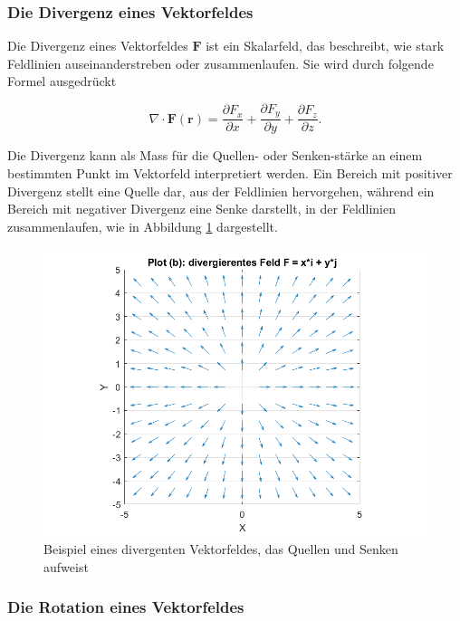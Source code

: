 \subsubsection{Die Divergenz eines Vektorfeldes}

Die Divergenz eines Vektorfeldes $\mathbf{F}$ ist ein Skalarfeld, das beschreibt, wie stark Feldlinien auseinanderstreben oder zusammenlaufen. Sie wird durch folgende Formel ausgedrückt

\begin{equation}
\nabla \cdot \mathbf{F}(\mathbf{r}) = \frac{\partial F_x}{\partial x} + \frac{\partial F_y}{\partial y} + \frac{\partial F_z}{\partial z}.
\end{equation}

\noindent Die Divergenz kann als Mass für die Quellen- oder Senken-stärke an einem bestimmten Punkt im Vektorfeld interpretiert werden. Ein Bereich mit positiver Divergenz stellt eine Quelle dar, aus der Feldlinien hervorgehen, während ein Bereich mit negativer Divergenz eine Senke darstellt, in der Feldlinien zusammenlaufen, wie in Abbildung \ref{fig:DivergenzAlg} dargestellt.

\begin{figure}[h!]
    \centering
    \includegraphics[scale=0.4]{papers/helmholtz/images/divergentes_Feld.png}
    \caption{Beispiel eines divergenten Vektorfeldes, das Quellen und Senken aufweist}
    \label{fig:DivergenzAlg}
\end{figure}

\subsubsection{Die Rotation eines Vektorfeldes}

